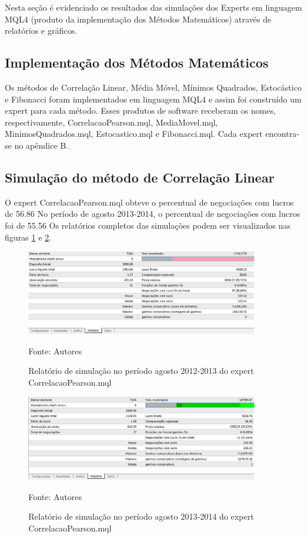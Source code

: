 Nesta seção é evidenciado os resultados  das simulações dos Experts em linguagem MQL4 (produto da implementação dos Métodos Matemáticos) através de relatórios e gráficos.

\subsection{Implementação dos Métodos Matemáticos}

Os métodos de Correlação Linear, Média Móvel, Mínimos Quadrados, Estocástico e Fibonacci foram implementados em linguagem MQL4 e assim foi construído um expert para cada método. Esses produtos de software receberam os nomes, respectivamente, CorrelacaoPearson.mql, MediaMovel.mql, MinimosQuadrados.mql, Estocastico.mql e Fibonacci.mql. Cada expert encontra-se no apêndice B.

\subsection{Simulação do método de Correlação Linear}

O expert CorrelacaoPearson.mql obteve o percentual de negociações com lucros de 56.86%
 No período de agosto 2013-2014, o percentual de negociações com lucros foi de 55.56%
Os relatórios completos das simulações podem ser visualizados nas figuras \ref{protocoloCorrelacao} e \ref{protocoloCorrelacao2}.

\begin{figure}[htp]
\centering
\includegraphics[width=0.9\textwidth]{figuras/protocoloCorrelacao}
\caption{Relatório de simulação no período agosto 2012-2013 do expert CorrelacaoPearson.mql}{Fonte: Autores} 
\label{protocoloCorrelacao}
\end{figure}

\begin{figure}[htp]
\centering
\includegraphics[width=0.9\textwidth]{figuras/protocoloCorrelacao2}
\caption{Relatório de simulação no período agosto 2013-2014 do expert CorrelacaoPearson.mql}{Fonte: Autores} 
\label{protocoloCorrelacao2}
\end{figure}

